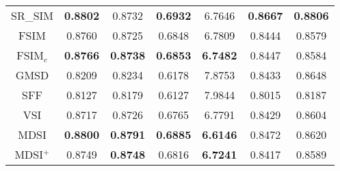 \begin{table}[htb]
\begin{tabular}{c|cccc|cc}
SR\_SIM \cite{SRSIM}                    & \textbf{0.8802} & 0.8732          & \textbf{0.6932} & 6.7646 & \textbf{0.8667} & \textbf{0.8806} \\
FSIM \cite{FSIM}                       & 0.8760          & 0.8725          & 0.6848          & 6.7809          & 0.8444          & 0.8579  \\
FSIM$_c$ \cite{FSIM}     & \textbf{0.8766} & \textbf{0.8738}          & \textbf{0.6853} & \textbf{6.7482} & 0.8447          & 0.8584  \\
GMSD \cite{GMSD}                       & 0.8209          & 0.8234          & 0.6178          & 7.8753          & 0.8433          & 0.8648    \\
SFF \cite{SFF}                        & 0.8127          & 0.8179          & 0.6127          & 7.9844          & 0.8015          & 0.8187     \\
VSI \cite{VSI}                        & 0.8717          & 0.8726          & 0.6765          & 6.7791          & 0.8429          & 0.8604      \\
MDSI                       & \textbf{0.8800} & \textbf{0.8791} & \textbf{0.6885} & \textbf{6.6146} & 0.8472          & 0.8620         \\
MDSI$^+$                       & 0.8749 & \textbf{0.8748} & 0.6816 & \textbf{6.7241} & 0.8417          & 0.8589          \\
\hline
\end{tabular}
\label{synthetic}
\end{table}




